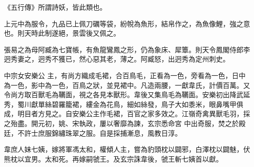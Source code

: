 \begin{pinyinscope}
 《五行傳》所謂詩妖，皆此類也。



 上元中為服令，九品已上佩刀礪等袋，紛帨為魚形，結帛作之，為魚像鯉，強之意也。則天時此制遂絕，景雲後又佩之。



 張易之為母阿臧為七寶帳，有魚龍鸞鳳之形，仍為象床、犀簟。則天令鳳閣侍郎李迥秀妻之，迥秀不獲已，然心惡其老，薄之。阿臧怒，出迥秀為定州刺史。



 中宗女安樂公
 主，有尚方織成毛裙，合百鳥毛，正看為一色，旁看為一色，日中為一色，影中為一色，百鳥之狀，並見裙中。凡造兩腰，一獻韋氏，計價百萬。又令尚方取百獸毛為韉面，視之各見本獸形。韋後又集鳥毛為韉面。安樂初出降武延秀，蜀川獻單絲碧羅籠裙，縷金為花鳥，細如絲發，鳥子大如黍米，眼鼻嘴甲俱成，明目者方見之。自安樂公主作毛裙，百官之家多效之。江嶺奇禽異獸毛羽，採之殆盡。開元初，姚、宋執政，屢以奢靡為諫，玄宗悉命宮
 中出奇服，焚之於殿廷，不許士庶服錦繡珠翠之服。自是採捕漸息，風教日淳。



 韋庶人妹七姨，嫁將軍馮太和，權傾人主，嘗為豹頭枕以闢邪，白澤枕以闢魅，伏熊枕以宜男。太和死。再嫁嗣虢王。及玄宗誅韋後，虢王斬七姨首以獻。



\end{pinyinscope}